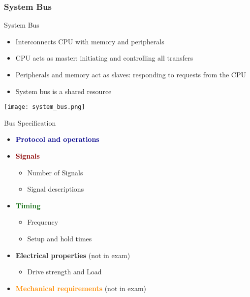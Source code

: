 \subsubsection{System Bus}

\begin{definition}{System Bus}
    \begin{itemize}
        \item Interconnects CPU with memory and peripherals
        \item CPU acts as master: initiating and controlling all transfers
        \item Peripherals and memory act as slaves: responding to requests from the CPU
        \item System bus is a shared resource
    \end{itemize}
    \texttt{[image: system\_bus.png]}
\end{definition}

\begin{concept}{Bus Specification}
    \begin{itemize}
        \item \textcolor{darkblue}{\textbf{Protocol and operations}}
        \item \textcolor{darkred}{\textbf{Signals}}
        \begin{itemize}
            \item Number of Signals
            \item Signal descriptions
        \end{itemize}
        \item \textcolor{darkgreen}{\textbf{Timing}}
        \begin{itemize}
            \item Frequency
            \item Setup and hold times
        \end{itemize}
        \item \textcolor{darkpurple}{\textbf{Electrical properties}} (not in exam)
        \begin{itemize}
            \item Drive strength and Load
        \end{itemize}
        \item \textcolor{darkorange}{\textbf{Mechanical requirements}} (not in exam)
    \end{itemize}
\end{concept}


